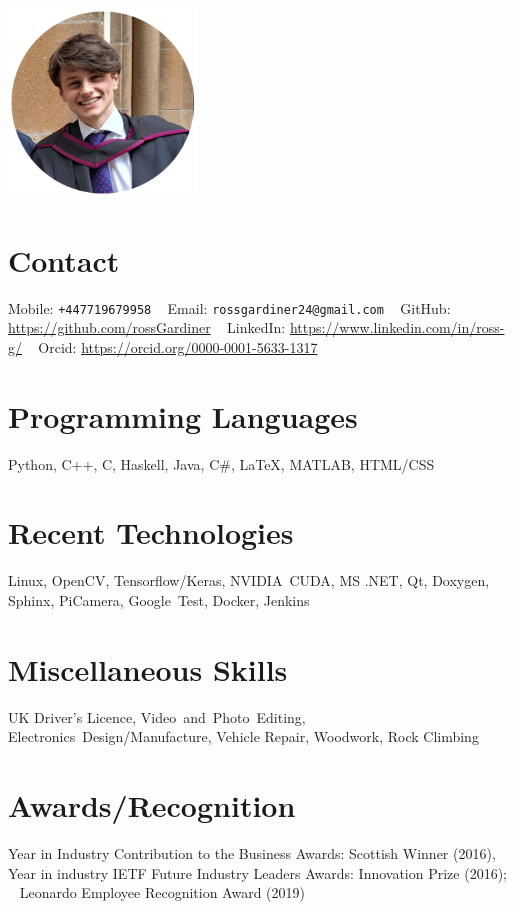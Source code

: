 \documentclass[]{cv-style}     %
\begin{document}
\lastupdated

\begin{aside}
\includegraphics[width=5cm]{g2-cropped}
\vspace{-0.3cm}
\section{Contact}
\vspace{0.1cm}Mobile: \texttt{+447719679958}
~
Email: \texttt{rossgardiner24@gmail.com}
~
GitHub: \url{https://github.com/rossGardiner}
~
LinkedIn: \url{https://www.linkedin.com/in/ross-g/}
~ 
Orcid: \url{https://orcid.org/0000-0001-5633-1317}
%

\section{Programming Languages}
Python, C++, C, Haskell, Java, C\#, \LaTeX, MATLAB, HTML/CSS
%
\section{Recent Technologies}
Linux, OpenCV, Tensorflow/Keras, NVIDIA~CUDA, MS .NET, Qt, Doxygen, Sphinx, PiCamera, Google~Test, Docker, Jenkins
\section{Miscellaneous Skills}
UK Driver's Licence, Video~and~Photo~Editing,
Electronics~Design/Manufacture, Vehicle Repair, Woodwork, Rock Climbing
\vspace{-0.2}
\section{Awards/Recognition}
Year in Industry Contribution to the Business Awards: Scottish Winner (2016),
~
Year in industry IETF Future Industry Leaders Awards: Innovation Prize (2016);
~
Leonardo Employee Recognition Award (2019)
\end{aside}
  \vspace{-0.3cm}
\end{document}
